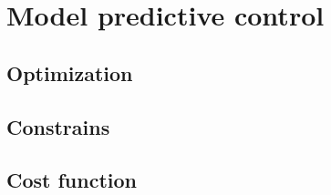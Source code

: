 \chapter{Model predictive control}
\label{ch:mpc}

\section{Optimization}
\label{section:optimization}
\section{Constrains}
\label{section:constrains}
\section{Cost function}
\label{section:costfunction}

